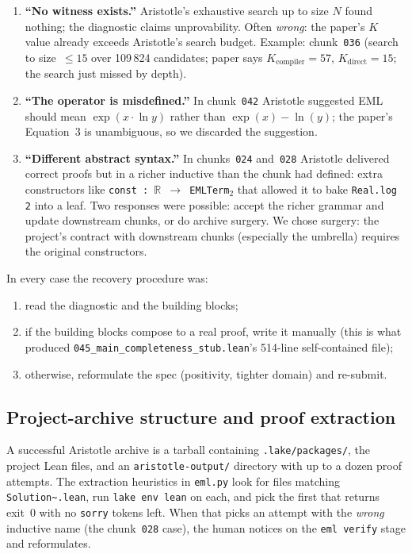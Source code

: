 \documentclass[11pt,a4paper]{article}
\theoremstyle{plain}
\theoremstyle{definition}
\newcommand{\R}{\mathbb{R}}
\begin{document}
\begin{enumerate}[leftmargin=*]
\item \textbf{``No witness exists.''}  Aristotle's exhaustive search up
to size $N$ found nothing; the diagnostic claims unprovability.  Often
\emph{wrong}: the paper's $K$ value already exceeds Aristotle's search
budget.  Example: chunk~\texttt{036} (search to size~$\le 15$ over
109\,824 candidates; paper says $K_{\text{compiler}}=57$,
$K_{\text{direct}}=15$; the search just missed by depth).
\item \textbf{``The operator is misdefined.''}  In chunk~\texttt{042}
Aristotle suggested EML should mean $\exp(x\cdot\ln y)$ rather than
$\exp(x)-\ln(y)$; the paper's Equation~3 is unambiguous, so we
discarded the suggestion.
\item \textbf{``Different abstract syntax.''}  In chunks~\texttt{024}
and~\texttt{028} Aristotle delivered correct proofs but in a richer
inductive than the chunk had defined: extra constructors like
\texttt{const : $\R$ $\to$ EMLTerm$_2$} that allowed it to bake
\texttt{Real.log 2} into a leaf.  Two responses were possible: accept
the richer grammar and update downstream chunks, or do archive surgery.
We chose surgery: the project's contract with downstream chunks
(especially the umbrella) requires the original constructors.
\end{enumerate}

In every case the recovery procedure was:
\begin{enumerate}[leftmargin=*,nosep]
\item read the diagnostic and the building blocks;
\item if the building blocks compose to a real proof, write it manually
(this is what produced \texttt{045\_main\_completeness\_stub.lean}'s
514-line self-contained file);
\item otherwise, reformulate the spec (positivity, tighter domain) and
re-submit.
\end{enumerate}

\subsection{Project-archive structure and proof extraction}

A successful Aristotle archive is a tarball containing
\texttt{.lake/packages/}, the project Lean files, and an
\texttt{aristotle-output/} directory with up to a dozen proof attempts.
The extraction heuristics in \texttt{eml.py} look for files matching
\texttt{Solution\textasciitilde*.lean}, run \texttt{lake env lean} on
each, and pick the first that returns exit~0 with no \texttt{sorry}
tokens left.  When that picks an attempt with the \emph{wrong}
inductive name (the chunk~\texttt{028} case), the human notices on the
\texttt{eml verify} stage and reformulates.
\end{document}
